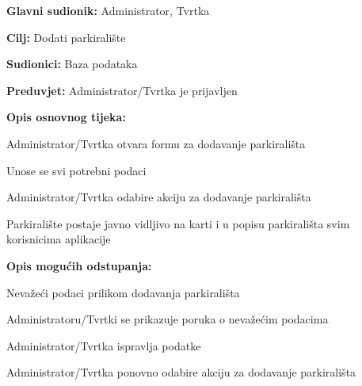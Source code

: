 \noindent {}
\begin{packed_item}

	\item \textbf{Glavni sudionik:} Administrator, Tvrtka
	\item \textbf{Cilj:} Dodati parkiralište
	\item \textbf{Sudionici:} Baza podataka
	\item \textbf{Preduvjet:} Administrator/Tvrtka je prijavljen
	\item \textbf{Opis osnovnog tijeka:}
	
	\item[] \begin{packed_enum}
		
		\item Administrator/Tvrtka otvara formu za dodavanje parkirališta
		\item Unose se svi potrebni podaci
		\item Administrator/Tvrtka odabire akciju za dodavanje parkirališta
		\item Parkiralište postaje javno vidljivo na karti i u popisu parkirališta svim korisnicima aplikacije

	\end{packed_enum}
	
	\item  \textbf{Opis mogućih odstupanja:}
	
	\item[] \begin{packed_item}
		
		\item[6.a] Nevažeći podaci prilikom dodavanja parkirališta
		\item[] \begin{packed_enum}
			
			\item Administratoru/Tvrtki se prikazuje poruka o nevažećim podacima
			\item Administrator/Tvrtka ispravlja podatke
			\item Administrator/Tvrtka ponovno odabire akciju za dodavanje parkirališta
			
		\end{packed_enum}
		
	\end{packed_item}
\end{packed_item}

